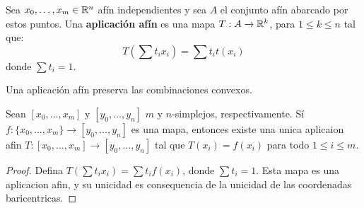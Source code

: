 \begin{definition}
    Sea $x_0, \dots, x_m \in \mathbb{R}^n$ af\'in independientes y sea $A$ el conjunto
    af\'in abarcado por estos puntos. Una  \textbf{aplicaci\'on af\'in} es una
    mapa $T:A \xrightarrow{} \mathbb{R}^k$, para $1 \leq k \leq n$ tal que:
    \begin{equation*}
        T(\sum{t_ix_i})=\sum{t_it(x_i)}
    \end{equation*}
    donde $\sum{t_i}=1$.
\end{definition}

\begin{lemma}\label{10.29}
    Una aplicaci\'on af\'in preserva las combinaciones convexos.
\end{lemma}

\begin{theorem}\label{10.30}
    Sean $[x_0, \dots, x_m]$ y $[y_0, \dots, y_n]$ $m$ y $n$-simplejos,
    respectivamente. S\'i $f:\{x_0, \dots, x_m\} \xrightarrow{} [y_0, \dots,
    y_n]$ es una mapa, entonces existe una unica aplicaion afin $T:[x_0, \dots,
    x_m] \xrightarrow{} [y_0, \dots, y_n]$ tal que $T(x_i)=f(x_i)$ para todo $1
    \leq i \leq m$.
\end{theorem}
\begin{proof}
    Defina $T(\sum{t_ix_i})=\sum{t_if(x_i)}$, donde $\sum{t_i}=1$. Esta mapa es
    una aplicacion afin, y su unicidad es consequencia de la unicidad de las
    coordenadas baricentricas.
\end{proof}
